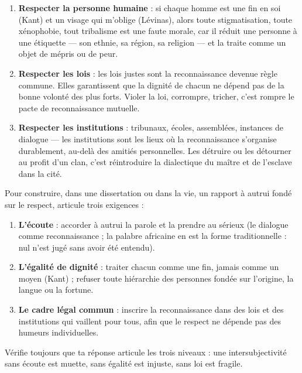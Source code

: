 \documentclass[11pt]{article}
\begin{document}
\begin{enumerate}
\item \textbf{Respecter la personne humaine} : si chaque homme est une fin en soi (Kant) et un visage qui m'oblige (Lévinas), alors toute stigmatisation, toute xénophobie, tout tribalisme est une faute morale, car il réduit une personne à une étiquette — son ethnie, sa région, sa religion — et la traite comme un objet de mépris ou de peur.
\item \textbf{Respecter les lois} : les lois justes sont la reconnaissance devenue règle commune. Elles garantissent que la dignité de chacun ne dépend pas de la bonne volonté des plus forts. Violer la loi, corrompre, tricher, c'est rompre le pacte de reconnaissance mutuelle.
\item \textbf{Respecter les institutions} : tribunaux, écoles, assemblées, instances de dialogue — les institutions sont les lieux où la reconnaissance s'organise durablement, au-delà des amitiés personnelles. Les détruire ou les détourner au profit d'un clan, c'est réintroduire la dialectique du maître et de l'esclave dans la cité.
\end{enumerate}

\begin{methode}
Pour construire, dans une dissertation ou dans la vie, un rapport à autrui fondé sur le respect, articule trois exigences :
\begin{enumerate}
\item \textbf{L'écoute} : accorder à autrui la parole et la prendre au sérieux (le dialogue comme reconnaissance ; la palabre africaine en est la forme traditionnelle : nul n'est jugé sans avoir été entendu).
\item \textbf{L'égalité de dignité} : traiter chacun comme une fin, jamais comme un moyen (Kant) ; refuser toute hiérarchie des personnes fondée sur l'origine, la langue ou la fortune.
\item \textbf{Le cadre légal commun} : inscrire la reconnaissance dans des lois et des institutions qui vaillent pour tous, afin que le respect ne dépende pas des humeurs individuelles.
\end{enumerate}
Vérifie toujours que ta réponse articule les trois niveaux : une intersubjectivité sans écoute est muette, sans égalité est injuste, sans loi est fragile.
\end{methode}
\end{document}
